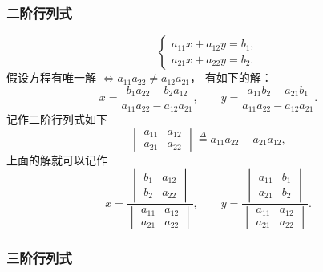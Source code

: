 \documentclass[UTF8,11pt]{ctexart}
\theoremstyle{cnthm}
\begin{document}
\subsubsection*{二阶行列式}

\[
\begin{cases}
a_{11}x+a_{12}y=b_1,\\
a_{21}x+a_{22}y=b_2.
\end{cases}
\]
假设方程有唯一解
$\Longleftrightarrow a_{11}a_{22}\neq a_{12}a_{21}$，
有如下的解：
\[
x=\frac{b_1a_{22}-b_2a_{12}}{a_{11}a_{22}-a_{12}a_{21}},\qquad
y=\frac{a_{11}b_2-a_{21}b_1}{a_{11}a_{22}-a_{12}a_{21}} .
\]
记作二阶行列式如下
\[
\begin{vmatrix}
a_{11} & a_{12}\\
a_{21} & a_{22}
\end{vmatrix}
\stackrel{\Delta}{=}a_{11}a_{22}-a_{21}a_{12},
\]
上面的解就可以记作
\[
x=\frac{
\begin{vmatrix}
b_1 & a_{12}\\
b_2 & a_{22}
\end{vmatrix}
}{
\begin{vmatrix}
a_{11} & a_{12}\\
a_{21} & a_{22}
\end{vmatrix}
},\qquad
y=\frac{
\begin{vmatrix}
a_{11} & b_1\\
a_{21} & b_2
\end{vmatrix}
}{
\begin{vmatrix}
a_{11} & a_{12}\\
a_{21} & a_{22}
\end{vmatrix}
}.
\]

\subsubsection*{三阶行列式}
\end{document}
